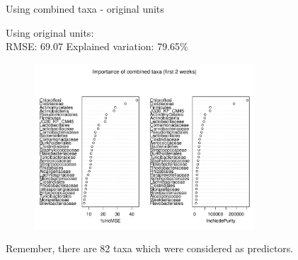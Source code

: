\documentclass{beamer}
\begin{document}
\begin{frame}{Using combined taxa - original units}

  {\scriptsize
    
  \noindent Using original units:\\
  RMSE: 69.07  \hspace{0.05in}  Explained variation: 79.65\%

  \begin{center}
    \begin{figure}
      \includegraphics[width=3.25in]{../all_together/first_two_weeks/orig_units_first_two_weeks_combined_imp_plot}
    \end{figure}
  \end{center}
  \vspace{-0.25in}

\noindent Remember, there are 82 taxa which were considered as predictors.
}

\end{frame}
\end{document}
